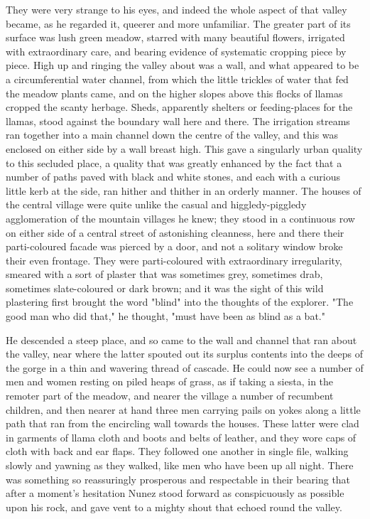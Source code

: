 \documentclass[submission]{sffms}
\begin{document}
They were very strange to his eyes, and indeed the whole aspect of
that valley became, as he regarded it, queerer and more
unfamiliar. The greater part of its surface was lush green meadow,
starred with many beautiful flowers, irrigated with extraordinary
care, and bearing evidence of systematic cropping piece by piece. High
up and ringing the valley about was a wall, and what appeared to be a
circumferential water channel, from which the little trickles of water
that fed the meadow plants came, and on the higher slopes above this
flocks of llamas cropped the scanty herbage. Sheds, apparently
shelters or feeding-places for the llamas, stood against the boundary
wall here and there. The irrigation streams ran together into a main
channel down the centre of the valley, and this was enclosed on either
side by a wall breast high. This gave a singularly urban quality to
this secluded place, a quality that was greatly enhanced by the fact
that a number of paths paved with black and white stones, and each
with a curious little kerb at the side, ran hither and thither in an
orderly manner.  The houses of the central village were quite unlike
the casual and higgledy-piggledy agglomeration of the mountain
villages he knew; they stood in a continuous row on either side of a
central street of astonishing cleanness, here and there their
parti-coloured facade was pierced by a door, and not a solitary window
broke their even frontage. They were parti-coloured with extraordinary
irregularity, smeared with a sort of plaster that was sometimes grey,
sometimes drab, sometimes slate-coloured or dark brown; and it was the
sight of this wild plastering first brought the word "blind" into the
thoughts of the explorer. "The good man who did that," he thought,
"must have been as blind as a bat."

He descended a steep place, and so came to the wall and channel that
ran about the valley, near where the latter spouted out its surplus
contents into the deeps of the gorge in a thin and wavering thread of
cascade. He could now see a number of men and women resting on piled
heaps of grass, as if taking a siesta, in the remoter part of the
meadow, and nearer the village a number of recumbent children, and
then nearer at hand three men carrying pails on yokes along a little
path that ran from the encircling wall towards the houses. These
latter were clad in garments of llama cloth and boots and belts of
leather, and they wore caps of cloth with back and ear flaps. They
followed one another in single file, walking slowly and yawning as
they walked, like men who have been up all night. There was something
so reassuringly prosperous and respectable in their bearing that after
a moment's hesitation Nunez stood forward as conspicuously as possible
upon his rock, and gave vent to a mighty shout that echoed round the
valley.
\end{document}

